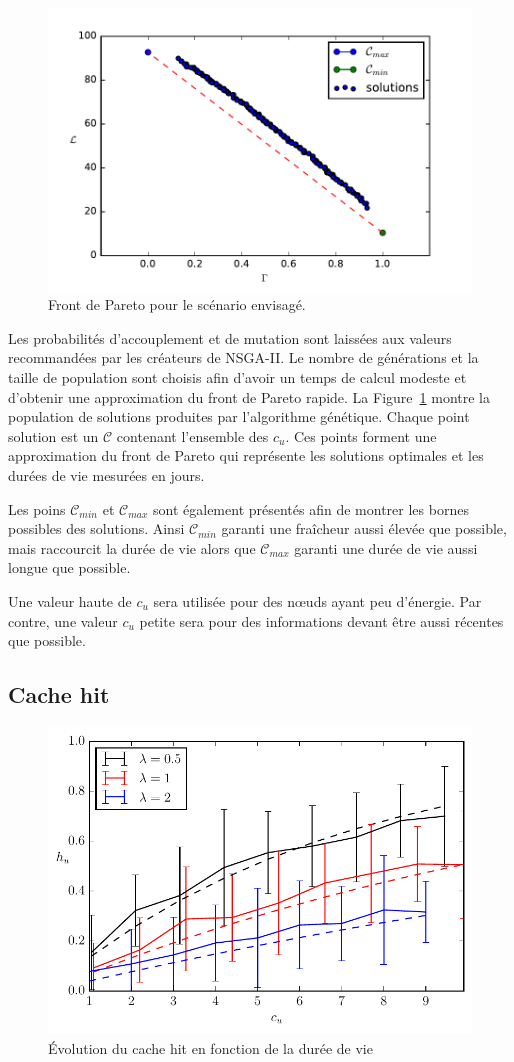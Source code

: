 \begin{figure}[ht]
  \centering

 \includegraphics[width=.7\textwidth]{img/pareto.pdf}

 \caption{Front de Pareto pour le scénario envisagé.}

 \label{cache:fig:paretofront}

\end{figure}

Les probabilités d'accouplement et de mutation sont laissées aux valeurs recommandées par les créateurs de NSGA-II.
Le nombre de générations et la taille de population sont choisis afin d'avoir un temps de calcul modeste et d'obtenir une approximation du front de Pareto rapide.
La Figure~\ref{cache:fig:paretofront} montre la population de solutions produites par l'algorithme génétique.
Chaque point solution est un $\mathcal{C}$ contenant l'ensemble des $c_u$.
Ces points forment une approximation du front de Pareto qui représente les solutions optimales et les durées de vie mesurées en jours.

Les poins $\mathcal{C}_{min}$ et $\mathcal{C}_{max}$ sont également présentés afin de montrer les bornes possibles des solutions.
Ainsi  $\mathcal{C}_{min}$ garanti une fraîcheur aussi élevée que possible, mais raccourcit la durée de vie alors que $\mathcal{C}_{max}$ garanti une durée de vie aussi longue que possible.

Une valeur haute de $c_u$ sera utilisée pour des nœuds ayant peu d'énergie.
Par contre, une valeur $c_u$ petite sera pour des informations devant être aussi récentes que possible.

\subsection{Cache hit}

\begin{figure}[ht]
  \centering
  \includegraphics[width=.5\textwidth]{img/new_cachinghit.pdf}
  \caption{Évolution du cache hit en fonction de la durée de vie}
  \label{cache:fig:hit}
\end{figure}

